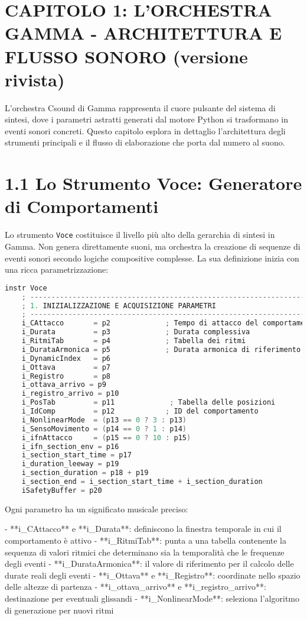 
\section{CAPITOLO 1: L'ORCHESTRA GAMMA - ARCHITETTURA E FLUSSO SONORO (versione rivista)}
L'orchestra Csound di Gamma rappresenta il cuore pulsante del sistema di sintesi, dove i parametri astratti generati dal motore Python si trasformano in eventi sonori concreti. Questo capitolo esplora in dettaglio l'architettura degli strumenti principali e il flusso di elaborazione che porta dal numero al suono.
\section{1.1 Lo Strumento Voce: Generatore di Comportamenti}
Lo strumento \texttt{Voce} costituisce il livello più alto della gerarchia di sintesi in Gamma. Non genera direttamente suoni, ma orchestra la creazione di sequenze di eventi sonori secondo logiche compositive complesse. La sua definizione inizia con una ricca parametrizzazione:

\begin{lstlisting}[language=C]
instr Voce
    ; -----------------------------------------------------------------------
    ; 1. INIZIALIZZAZIONE E ACQUISIZIONE PARAMETRI
    ; -----------------------------------------------------------------------
    i_CAttacco       = p2             ; Tempo di attacco del comportamento
    i_Durata         = p3             ; Durata complessiva
    i_RitmiTab       = p4             ; Tabella dei ritmi
    i_DurataArmonica = p5             ; Durata armonica di riferimento
    i_DynamicIndex   = p6         
    i_Ottava         = p7             
    i_Registro       = p8             
    i_ottava_arrivo = p9
    i_registro_arrivo = p10
    i_PosTab         = p11             ; Tabella delle posizioni
    i_IdComp         = p12            ; ID del comportamento
    i_NonlinearMode  = (p13 == 0 ? 3 : p13)
    i_SensoMovimento = (p14 == 0 ? 1 : p14) 
    i_ifnAttacco     = (p15 == 0 ? 10 : p15)
    i_ifn_section_env = p16 
    i_section_start_time = p17
    i_duration_leeway = p19
    i_section_duration = p18 + p19
    i_section_end = i_section_start_time + i_section_duration
    iSafetyBuffer = p20
\end{lstlisting}

Ogni parametro ha un significato musicale preciso:

- **i_CAttacco** e **i_Durata**: definiscono la finestra temporale in cui il comportamento è attivo
- **i_RitmiTab**: punta a una tabella contenente la sequenza di valori ritmici che determinano sia la temporalità che le frequenze degli eventi
- **i_DurataArmonica**: il valore di riferimento per il calcolo delle durate reali degli eventi
- **i_Ottava** e **i_Registro**: coordinate nello spazio delle altezze di partenza
- **i_ottava_arrivo** e **i_registro_arrivo**: destinazione per eventuali glissandi
- **i_NonlinearMode**: seleziona l'algoritmo di generazione per nuovi ritmi

